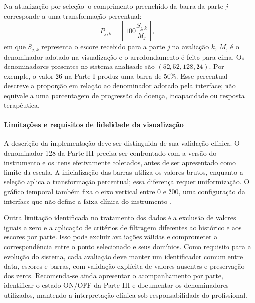 Na atualização por seleção, o comprimento preenchido da barra da parte $j$ corresponde a uma transformação percentual:
\begin{equation}
    P_{j,k}=\left\lceil 100\frac{S_{j,k}}{M_j}\right\rceil,
\end{equation}
em que $S_{j,k}$ representa o escore recebido para a parte $j$ na avaliação $k$, $M_j$ é o denominador adotado na visualização e o arredondamento é feito para cima. Os denominadores presentes no sistema analisado são $(52,52,128,24)$. Por exemplo, o valor 26 na Parte I produz uma barra de 50\%. Esse percentual descreve a proporção em relação ao denominador adotado pela interface; não equivale a uma porcentagem de progressão da doença, incapacidade ou resposta terapêutica.

\paragraph{Limitações e requisitos de fidelidade da visualização}
A descrição da implementação deve ser distinguida de sua validação clínica. O denominador 128 da Parte III precisa ser confrontado com a versão do instrumento e os itens efetivamente coletados, antes de ser apresentado como limite da escala. A inicialização das barras utiliza os valores brutos, enquanto a seleção aplica a transformação percentual; essa diferença requer uniformização. O gráfico temporal também fixa o eixo vertical entre 0 e 200, uma configuração da interface que não define a faixa clínica do instrumento \cite{parkinsonDashboardFront2026}.

Outra limitação identificada no tratamento dos dados é a exclusão de valores iguais a zero e a aplicação de critérios de filtragem diferentes ao histórico e aos escores por parte. Isso pode excluir avaliações válidas e comprometer a correspondência entre o ponto selecionado e seus domínios. Como requisito para a evolução do sistema, cada avaliação deve manter um identificador comum entre data, escores e barras, com validação explícita de valores ausentes e preservação dos zeros. Recomenda-se ainda apresentar o acompanhamento por parte, identificar o estado ON/OFF da Parte III e documentar os denominadores utilizados, mantendo a interpretação clínica sob responsabilidade do profissional.
